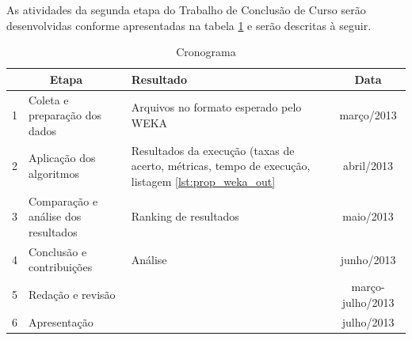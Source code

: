 As atividades da segunda etapa do Trabalho de Conclusão de Curso serão desenvolvidas conforme apresentadas na tabela \ref{tab:prop_cron} e serão descritas à seguir.

\begin{table}[h]
    \caption{Cronograma}
    \centering
    \begin{tabular}{l >{\arraybackslash}m{4cm} >{\centering\arraybackslash}m{7cm} c}
        \multicolumn{2}{c}{Etapa} & Resultado & Data \\
        \hline
        1 & Coleta e preparação dos dados       & Arquivos no formato esperado pelo WEKA & março/2013 \\
        2 & Aplicação dos algoritmos            & Resultados da execução (taxas de acerto, métricas, tempo de execução, listagem \ref{lst:prop_weka_out} & abril/2013 \\
        3 & Comparação e análise dos resultados & Ranking de resultados & maio/2013 \\
        4 & Conclusão e contribuições           & Análise & junho/2013 \\
        5 & Redação e revisão                   & & março-julho/2013 \\
        6 & Apresentação                        & & julho/2013 \\
    \end{tabular}
    \label{tab:prop_cron}
\end{table}

